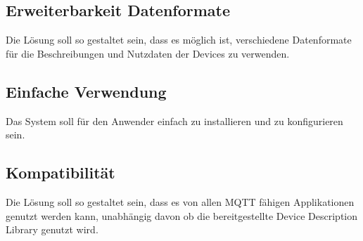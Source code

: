 \subsection{Erweiterbarkeit Datenformate}
Die Lösung soll so gestaltet sein, dass es möglich ist, verschiedene Datenformate für die Beschreibungen und Nutzdaten der Devices zu verwenden.

\subsection{Einfache Verwendung}
Das System soll für den Anwender einfach zu installieren und zu konfigurieren sein.

\subsection{Kompatibilität}
Die Lösung soll so gestaltet sein, dass es von allen MQTT fähigen Applikationen genutzt werden kann, unabhängig davon ob die bereitgestellte Device Description Library genutzt wird.